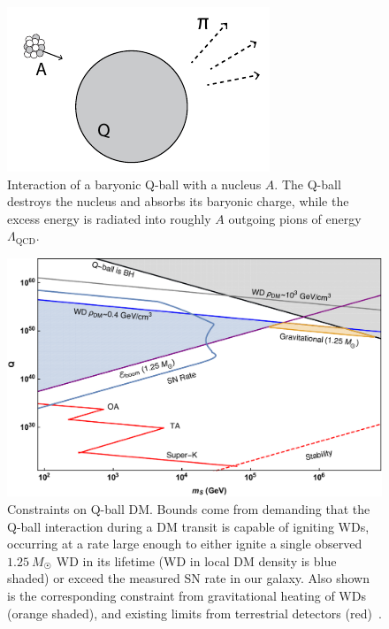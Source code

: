 \documentclass[preprintnumbers,amsmath,amssymb,prd,superscriptaddress]{revtex4}
\begin{document}
\begin{figure}
\includegraphics[scale=1.0]{qball-cartoon.pdf}
\caption{Interaction of a baryonic Q-ball with a nucleus $A$. The Q-ball destroys the nucleus and absorbs its baryonic charge, while the excess energy is radiated into roughly $A$ outgoing pions of energy $\Lambda_\text{QCD}$.}
\label{fig:qball-cartoon}
\end{figure}

\begin{figure}
\includegraphics[scale=.45]{Qballconstraint.pdf}
\caption{
Constraints on Q-ball DM.
Bounds come from demanding that the Q-ball interaction during a DM transit is capable of igniting WDs, occurring at a rate large enough to either ignite a single observed $1.25~M_{\astrosun}$ WD in its lifetime (WD in local DM density is blue shaded) or exceed the measured SN rate in our galaxy.
Also shown is the corresponding constraint from gravitational heating of WDs (orange shaded), and existing limits from terrestrial detectors (red)~\cite{Dine:2003ax}.}
\label{fig:Qballconstraint}
\end{figure}

\end{document}
